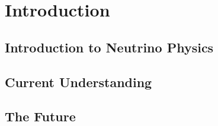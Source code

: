 
\graphicspath{{Introduction/Figs/}}

\chapter{Introduction}\label{chap:Introduction}

\section{Introduction to Neutrino Physics}\label{sec:IntroNeutrinos}

\section{Current Understanding}\label{sec:CurrentUnderstanding}

\section{The Future}\label{sec:TheFuture}
